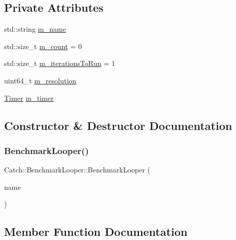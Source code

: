 \subsection*{Private Attributes}
\begin{DoxyCompactItemize}
\item 
std\+::string \mbox{\hyperlink{class_catch_1_1_benchmark_looper_afa2005187a2abbcae69a5b16c89e68c3}{m\+\_\+name}}
\item 
std\+::size\+\_\+t \mbox{\hyperlink{class_catch_1_1_benchmark_looper_aae36ced9e5b1c884e2b3ac9d04c1c373}{m\+\_\+count}} = 0
\item 
std\+::size\+\_\+t \mbox{\hyperlink{class_catch_1_1_benchmark_looper_af28bef6706fe983afca85d2ccd2b6ca8}{m\+\_\+iterations\+To\+Run}} = 1
\item 
uint64\+\_\+t \mbox{\hyperlink{class_catch_1_1_benchmark_looper_a7e7168e3d346e78d6e85c810aec6a55d}{m\+\_\+resolution}}
\item 
\mbox{\hyperlink{class_catch_1_1_timer}{Timer}} \mbox{\hyperlink{class_catch_1_1_benchmark_looper_af86aacecba12576f96a1d3f321a0c959}{m\+\_\+timer}}
\end{DoxyCompactItemize}


\subsection{Constructor \& Destructor Documentation}
\mbox{\label{class_catch_1_1_benchmark_looper_ab9ba6397306a70082f39e63a8a71bde6}} 
\subsubsection{\texorpdfstring{BenchmarkLooper()}{BenchmarkLooper()}}
{\footnotesize\ttfamily Catch\+::\+Benchmark\+Looper\+::\+Benchmark\+Looper (\begin{DoxyParamCaption}\item[{\mbox{\hyperlink{class_catch_1_1_string_ref}{String\+Ref}}}]{name }\end{DoxyParamCaption})\hspace{0.3cm}{\ttfamily [inline]}}



\subsection{Member Function Documentation}
\mbox{\label{class_catch_1_1_benchmark_looper_a45fd79f05ac1fb21dcfb3a81cf052705}} 
